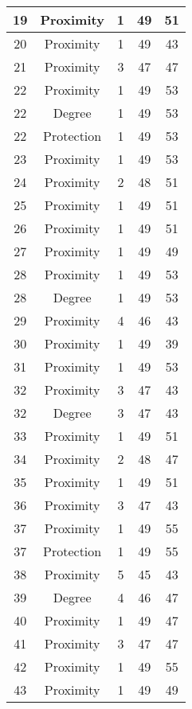 \documentclass[results.tex]{subfiles}
\begin{document}
\begin{center}
\begin{tabular}{| c || c | c | c | c |}
    \hline
    19 & Proximity & 1 & 49 & 51 \\ 
    \hline
    20 & Proximity & 1 & 49 & 43 \\ 
    \hline
    21 & Proximity & 3 & 47 & 47 \\ 
    \hline
    22 & Proximity & 1 & 49 & 53 \\ 
    \hline
    22 & Degree & 1 & 49 & 53 \\ 
    \hline
    22 & Protection & 1 & 49 & 53 \\ 
    \hline
    23 & Proximity & 1 & 49 & 53 \\ 
    \hline
    24 & Proximity & 2 & 48 & 51 \\ 
    \hline
    25 & Proximity & 1 & 49 & 51 \\ 
    \hline
    26 & Proximity & 1 & 49 & 51 \\ 
    \hline
    27 & Proximity & 1 & 49 & 49 \\ 
    \hline
    28 & Proximity & 1 & 49 & 53 \\ 
    \hline
    28 & Degree & 1 & 49 & 53 \\ 
    \hline
    29 & Proximity & 4 & 46 & 43 \\ 
    \hline
    30 & Proximity & 1 & 49 & 39 \\ 
    \hline
    31 & Proximity & 1 & 49 & 53 \\ 
    \hline
    32 & Proximity & 3 & 47 & 43 \\ 
    \hline
    32 & Degree & 3 & 47 & 43 \\ 
    \hline
    33 & Proximity & 1 & 49 & 51 \\ 
    \hline
    34 & Proximity & 2 & 48 & 47 \\ 
    \hline
    35 & Proximity & 1 & 49 & 51 \\ 
    \hline
    36 & Proximity & 3 & 47 & 43 \\ 
    \hline
    37 & Proximity & 1 & 49 & 55 \\ 
    \hline
    37 & Protection & 1 & 49 & 55 \\ 
    \hline
    38 & Proximity & 5 & 45 & 43 \\ 
    \hline
    39 & Degree & 4 & 46 & 47 \\ 
    \hline
    40 & Proximity & 1 & 49 & 47 \\ 
    \hline
    41 & Proximity & 3 & 47 & 47 \\ 
    \hline
    42 & Proximity & 1 & 49 & 55 \\ 
    \hline
    43 & Proximity & 1 & 49 & 49 \\ 

\end{tabular}
\end{center}
\end{document}
